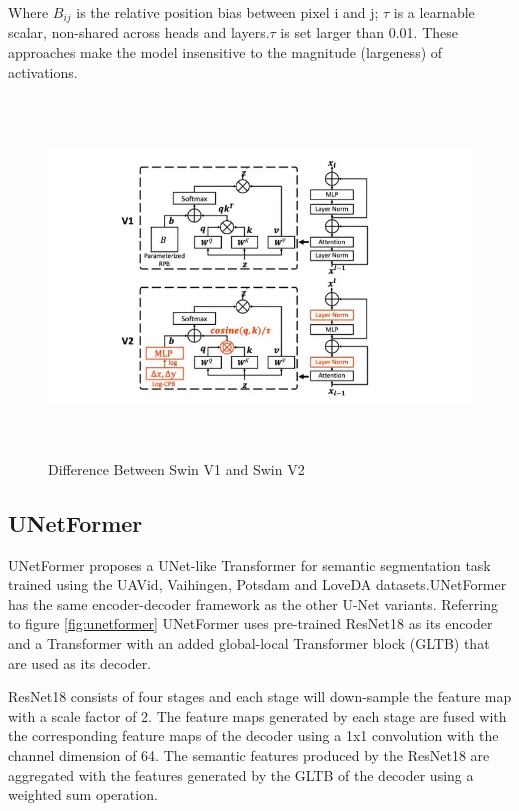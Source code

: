 Where $B_{ij}$ is the relative position bias between pixel i and j; $\tau$ is a learnable scalar, non-shared across heads and layers.$\tau$ is set larger than 0.01. These approaches make the model insensitive to the magnitude (largeness) of activations.
\FloatBarrier
\begin{figure}[ht]
\includegraphics[width=13.5cm, height=9.5cm]{images/swin1-vs-swin2.jpg}
\centering
\caption{Difference Between Swin V1 and Swin V2 \protect\cite{swin-v2}}
\label{fig:swin v1 vs v2}
\end{figure}
\FloatBarrier

\subsection{UNetFormer}
UNetFormer \cite{unetformer} proposes a UNet-like Transformer for semantic segmentation task trained using the UAVid, Vaihingen, Potsdam and LoveDA datasets.UNetFormer has the same encoder-decoder framework as the other U-Net variants. Referring to figure \ref{fig:unetformer} UNetFormer uses pre-trained ResNet18 as its encoder and a Transformer with an added global-local Transformer block (GLTB) that are used as its decoder. 

ResNet18 consists of four stages and each stage will down-sample the feature map with a scale factor of 2. The feature maps generated by each stage are fused with the corresponding feature maps of the decoder using a 1x1 convolution with the channel dimension of 64. The semantic features produced by the ResNet18 are aggregated with the features generated by the GLTB of the decoder using a weighted sum operation. 

